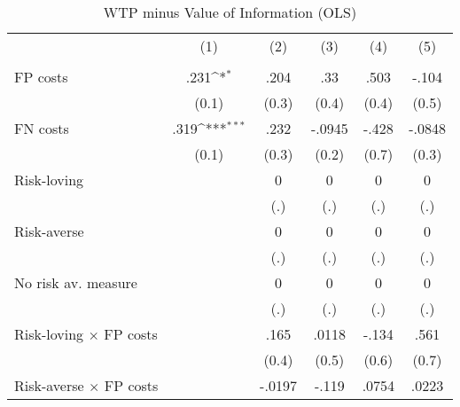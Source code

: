 \begin{table}[htbp]\centering
\def\sym#1{\ifmmode^{#1}\else\(^{#1}\)\fi}
\caption{WTP minus Value of Information (OLS)}
\begin{tabular}{l*{5}{c}}
\hline\hline
                &\multicolumn{1}{c}{(1)}&\multicolumn{1}{c}{(2)}&\multicolumn{1}{c}{(3)}&\multicolumn{1}{c}{(4)}&\multicolumn{1}{c}{(5)}\\
                &\multicolumn{1}{c}{}&\multicolumn{1}{c}{}&\multicolumn{1}{c}{}&\multicolumn{1}{c}{}&\multicolumn{1}{c}{}\\
\hline
FP costs        &     .231\sym{*}  &     .204         &      .33         &     .503         &    -.104         \\
                &    (0.1)         &    (0.3)         &    (0.4)         &    (0.4)         &    (0.5)         \\
FN costs        &     .319\sym{***}&     .232         &   -.0945         &    -.428         &   -.0848         \\
                &    (0.1)         &    (0.3)         &    (0.2)         &    (0.7)         &    (0.3)         \\
Risk-loving     &                  &        0         &        0         &        0         &        0         \\
                &                  &      (.)         &      (.)         &      (.)         &      (.)         \\
Risk-averse     &                  &        0         &        0         &        0         &        0         \\
                &                  &      (.)         &      (.)         &      (.)         &      (.)         \\
No risk av. measure&                  &        0         &        0         &        0         &        0         \\
                &                  &      (.)         &      (.)         &      (.)         &      (.)         \\
Risk-loving $\times$ FP costs&                  &     .165         &    .0118         &    -.134         &     .561         \\
                &                  &    (0.4)         &    (0.5)         &    (0.6)         &    (0.7)         \\
Risk-averse $\times$ FP costs&                  &   -.0197         &    -.119         &    .0754         &    .0223         \\

\end{tabular}
\end{table}
